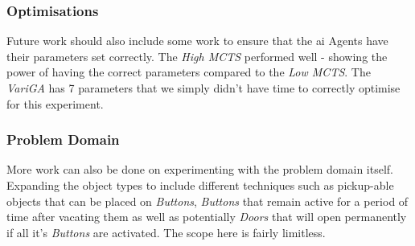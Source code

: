 \documentclass{IEEEtran}
\begin{document}
\subsubsection{Optimisations}
Future work should also include some work to ensure that the \gls{ai} Agents have their parameters set correctly. The \emph{High MCTS} performed well - showing the power of having the correct parameters compared to the \emph{Low MCTS}. The \emph{VariGA} has 7 parameters that we simply didn't have time to correctly optimise for this experiment.

\subsubsection{Problem Domain}
More work can also be done on experimenting with the problem domain itself. Expanding the object types to include different techniques such as pickup-able objects that can be placed on \emph{Buttons}, \emph{Buttons} that remain active for a period of time after vacating them as well as potentially \emph{Doors} that will open permanently if all it's \emph{Buttons} are activated. The scope here is fairly limitless.



\end{document}
